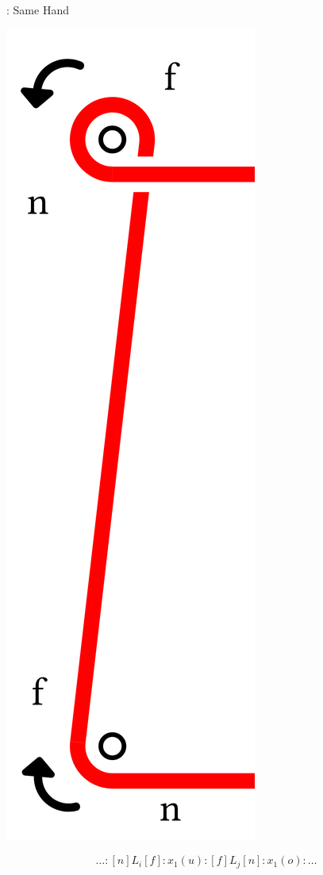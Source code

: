 \begin{frame}{\subsecname: Same Hand}
\begin{adjustwidth}{-1.5em}{-1.5em}
\begin{minipage}{0.5\textwidth}
\begin{center}
\includegraphics[width=0.3\linewidth]{figures/same-odd.png}
\end{center}
$$
\scriptstyle
\ldots:[n]L_i[f]:x_1(u):[f]L_j[n]:x_1(o):\ldots
$$
\end{minipage}
\end{adjustwidth}
\end{frame}

